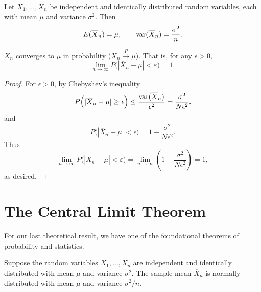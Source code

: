 \documentclass[../m157main.tex]{subfiles}
\begin{document}
\begin{theorem}
    Let $X_1, \ldots, X_n$ be independent and identically distributed random variables, each with mean $\mu$ and variance $\sigma^2$.
    Then
    \[ E(\overline{X}_n) = \mu, \qquad \textrm{var}(\overline{X}_n) = \frac{\sigma^2}{n}. \]
\end{theorem}

\begin{theorem}
    $\overline{X}_n$ converges to $\mu$ in probability ($\overline{X}_n \overset{P}{\to} \mu$).
    That is, for any $\epsilon > 0$,
    \[ \lim_{n \to \infty} P \Big( |\overline{X}_n - \mu| < \varepsilon \Big) = 1. \]
\end{theorem}

\begin{proof}
    For $\epsilon > 0$, by Chebyshev's inequality
    \[ P \Big( |\overline{X}_n - \mu| \geq \epsilon \Big) \leq \frac{\textrm{var}(\overline{X}_n)}{\epsilon^2} = \frac{\sigma^2}{N \epsilon^2}. \]
    and
    \[ P \Big( |\overline{X}_n - \mu| < \epsilon \Big) = 1 - \frac{\sigma^2}{N\epsilon^2}. \]
    Thus
    \[ \lim_{n \to \infty} P \Big( |\overline{X}_n - \mu| < \varepsilon \Big) = \lim_{n \to \infty} \left( 1 - \frac{\sigma^2}{N \epsilon^2} \right) = 1, \]
    as desired.
\end{proof}

\pagebreak

\section{The Central Limit Theorem}
For our last theoretical result, we have one of the foundational theorems of probability and statistics.

\begin{theorem}
    Suppose the random variables $X_1, \ldots, X_n$ are independent and identically distributed with mean $\mu$ and variance $\sigma^2$.
    The sample mean $\overline{X}_n$ is normally distributed with mean $\mu$ and variance $\sigma^2 / n$.
\end{theorem}
\end{document}
